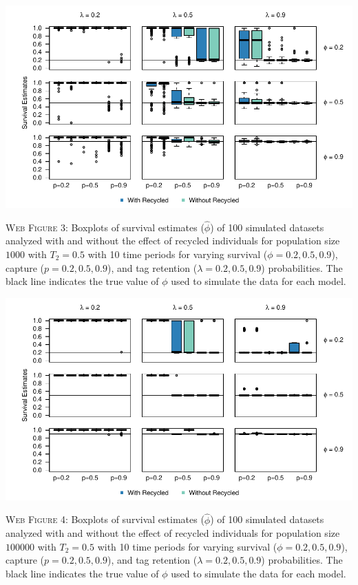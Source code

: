 \documentclass[]{article}
\begin{document}
\newpage

\includegraphics{Appendix_files/figure-latex/3_survival_GJSTL4-1.pdf}

\textsc{Web Figure 3:} Boxplots of survival estimates (\(\hat{\phi}\))
of 100 simulated datasets analyzed with and without the effect of
recycled individuals for population size \(1000\) with \(T_2=0.5\) with
10 time periods for varying survival (\(\phi=0.2,0.5,0.9\)), capture
(\(p=0.2,0.5,0.9\)), and tag retention (\(\lambda=0.2,0.5,0.9\))
probabilities. The black line indicates the true value of \(\phi\) used
to simulate the data for each model.

\includegraphics{Appendix_files/figure-latex/4_survival_GJSTL3-1.pdf}

\textsc{Web Figure 4:} Boxplots of survival estimates (\(\hat{\phi}\))
of 100 simulated datasets analyzed with and without the effect of
recycled individuals for population size \(100000\) with \(T_2=0.5\)
with 10 time periods for varying survival (\(\phi=0.2,0.5,0.9\)),
capture (\(p=0.2,0.5,0.9\)), and tag retention (\(\lambda=0.2,0.5,0.9\))
probabilities. The black line indicates the true value of \(\phi\) used
to simulate the data for each model.
\end{document}
